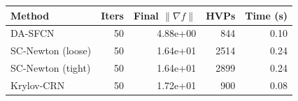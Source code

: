\begin{tabular}{@{}lrrrr@{}}
\toprule
Method & Iters & Final $\|\nabla f\|$ & HVPs & Time (s) \\
\midrule
DA-SFCN & 50 & 4.88e+00 & 844 & 0.10 \\
SC-Newton (loose) & 50 & 1.64e+01 & 2514 & 0.24 \\
SC-Newton (tight) & 50 & 1.64e+01 & 2899 & 0.24 \\
Krylov-CRN & 50 & 1.72e+01 & 900 & 0.08 \\
\bottomrule
\end{tabular}